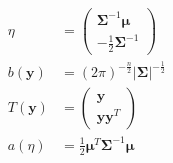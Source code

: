 \documentclass[a4paper]{article}
\begin{document}
\begin{enumerate}
\begin{equation*}
\begin{aligned}
    \eta &= 
    \begin{pmatrix}
      {\boldsymbol \Sigma}^{-1}\boldsymbol{\mu}\\
      -\frac{1}{2}{\boldsymbol \Sigma}^{-1}
    \end{pmatrix}\\
    b(\boldsymbol y) &= (2\pi)^{-\frac{n}{2}}|\boldsymbol \Sigma|^{-\frac{1}{2}}\\
    T(\boldsymbol y)&=
    \begin{pmatrix}
      \boldsymbol{y}\\
      \boldsymbol{y y}^T
    \end{pmatrix}\\
    a(\eta) &= \frac{1}{2} \boldsymbol{\mu}^T{\boldsymbol \Sigma}^{-1}\boldsymbol{\mu}
  \end{aligned}
\end{equation*}
\end{enumerate}
  
  
  
\end{document}
